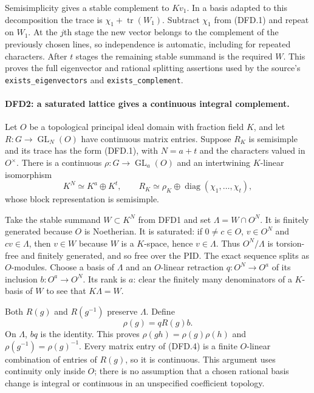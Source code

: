 \documentclass[11pt,a4paper]{article}
\numberwithin{equation}{section}
\theoremstyle{remark}\newtheorem{remark}[theorem]{Remark}
\begin{document}
Semisimplicity gives a stable complement to $Kv_1$. In a basis
adapted to this decomposition the trace is
$\chi_1+\operatorname{tr}(W_1)$. Subtract $\chi_1$ from (DFD.1)
and repeat on $W_1$. At the $j$th stage the new vector belongs to
the complement of the previously chosen lines, so independence is
automatic, including for repeated characters. After $t$ stages
the remaining stable summand is the required $W$. This proves the
full eigenvector and rational splitting assertions used by the
source's \texttt{exists\_\allowbreak eigenvectors} and \texttt{exists\_\allowbreak complement}.

\paragraph{DFD2: a saturated lattice gives a continuous integral complement.}
\label{claim:DFD2}
Let $O$ be a topological principal ideal domain with fraction field
$K$, and let $R:G\to\operatorname{GL}_N(O)$ have continuous matrix
entries. Suppose $R_K$ is semisimple and its trace has the form
(DFD.1), with $N=a+t$ and the characters valued in $O^\times$.
There is a continuous $\rho:G\to\operatorname{GL}_a(O)$ and an
intertwining $K$-linear isomorphism
\[
 K^N\simeq K^a\oplus K^t,
 \qquad R_K\simeq\rho_K\oplus
      \operatorname{diag}(\chi_1,\ldots,\chi_t),           \tag{DFD.3}
\]
whose block representation is semisimple.

Take the stable summand $W\subset K^N$ from DFD1 and set
$\Lambda=W\cap O^N$. It is finitely generated because $O$ is
Noetherian. It is saturated: if $0\ne c\in O$, $v\in O^N$ and
$cv\in\Lambda$, then $v\in W$ because $W$ is a $K$-space, hence
$v\in\Lambda$. Thus $O^N/\Lambda$ is torsion-free and finitely
generated, and so free over the PID. The exact sequence splits
as $O$-modules. Choose a basis of $\Lambda$ and an $O$-linear
retraction $q:O^N\to O^a$ of its inclusion
$b:O^a\to O^N$. Its rank is $a$: clear the finitely many
denominators of a $K$-basis of $W$ to see that $K\Lambda=W$.

Both $R(g)$ and $R(g^{-1})$ preserve $\Lambda$. Define
\[
             \rho(g)=qR(g)b.                             \tag{DFD.4}
\]
On $\Lambda$, $bq$ is the identity. This proves
$\rho(gh)=\rho(g)\rho(h)$ and
$\rho(g^{-1})=\rho(g)^{-1}$. Every matrix entry of (DFD.4) is a
finite $O$-linear combination of entries of $R(g)$, so it is
continuous. This argument uses continuity only inside $O$;
there is no assumption that a chosen rational basis change is
integral or continuous in an unspecified coefficient topology.
\end{document}
